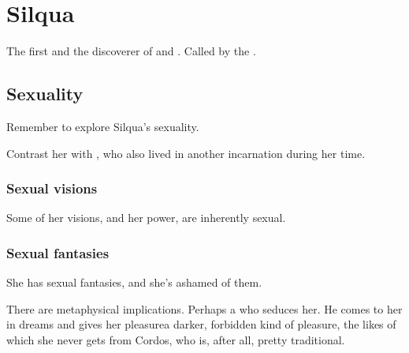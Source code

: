 \section{Silqua}
The first  and the discoverer of  and . 
Called  by the . 







\subsection{Sexuality}
Remember to explore Silqua's sexuality. 

Contrast her with \Belzir, who also lived in another incarnation during her time.





\subsubsection{Sexual visions}
Some of her visions, and her \malach{} power, are inherently sexual. 





\subsubsection{Sexual fantasies}
She has sexual fantasies, and she's ashamed of them. 

There are metaphysical implications. Perhaps a \resphan{} who seduces her. He comes to her in dreams and gives her pleasure\dash a darker, forbidden kind of pleasure, the likes of which she never gets from Cordos, who is, after all, pretty traditional. 

